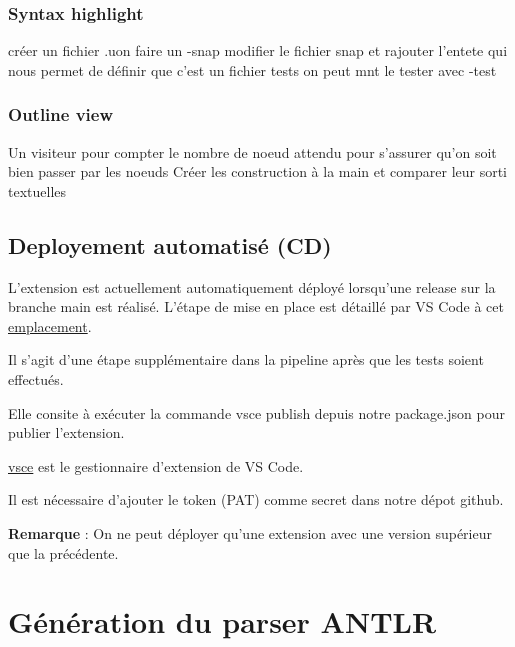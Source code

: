 \documentclass[
    iict, %
    il, %
]{heig-tb}
\begin{document}
\subsubsection{Syntax highlight}
créer un fichier .uon
faire un -snap
modifier le fichier snap et rajouter l'entete qui nous permet de définir que c'est un fichier tests
on peut mnt le tester avec -test


\subsubsection{Outline view}
Un visiteur pour compter le nombre de noeud attendu pour s'assurer qu'on soit bien passer par les noeuds
Créer les construction à la main et comparer leur sorti textuelles



\subsection{Deployement automatisé (CD)}

L'extension est actuellement automatiquement déployé lorsqu'une release sur la branche main est réalisé.
L'étape de mise en place est détaillé par VS Code à cet \href{https://code.visualstudio.com/api/working-with-extensions/continuous-integration#github-actions}{emplacement}.

Il s'agit d'une étape supplémentaire dans la pipeline après que les tests soient effectués.

Elle consite à exécuter la commande vsce publish depuis notre package.json pour publier l'extension.

\href{https://www.npmjs.com/package/vsce}{vsce} est le gestionnaire d'extension de VS Code.

Il est nécessaire d'ajouter le token (PAT) comme secret dans notre dépot github. %

\textbf{Remarque } : On ne peut déployer qu'une extension avec une version supérieur que la précédente. %




\section{Génération du parser ANTLR}
\end{document}
